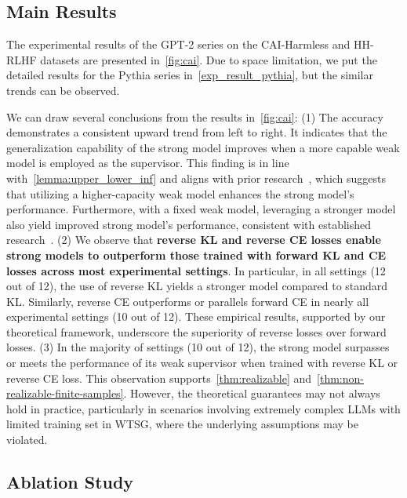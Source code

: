 \subsection{Main Results} \label{sec:main_results}

The experimental results of the GPT-2 series on the CAI-Harmless and HH-RLHF datasets are presented in~\cref{fig:cai}. 
Due to space limitation, we put the detailed results for the Pythia series in~\cref{exp_result_pythia}, but the similar trends can be observed. 

We can draw several conclusions from the results in~\cref{fig:cai}: 
(1) The accuracy demonstrates a consistent upward trend from left to right. 
It indicates that the generalization capability of the strong model improves when a more capable weak model is employed as the supervisor.
This finding is in line with~\cref{lemma:upper_lower_inf} and aligns with prior research~\citep{burns2023weak,yao2025understanding}, which suggests that utilizing a higher-capacity weak model enhances the strong model's performance.
Furthermore, with a fixed weak model, leveraging a stronger model also yield improved strong model's performance, consistent with established research~\citep{burns2023weak,yang2024super}.
(2) We observe that \textbf{reverse KL and reverse CE losses enable strong models to outperform those trained with forward KL and CE losses across most experimental settings}.
In particular, in all settings (12 out of 12), the use of reverse KL yields a stronger model compared to standard KL.
Similarly, reverse CE outperforms or parallels forward CE in nearly all experimental settings (10 out of 12). 
These empirical results, supported by our theoretical framework, underscore the superiority of reverse losses over forward losses.
(3) In the majority of settings (10 out of 12), the strong model surpasses or meets the performance of its weak supervisor when trained with reverse KL or reverse CE loss. This observation supports~\cref{thm:realizable} and~\cref{thm:non-realizable-finite-samples}. 
However, the theoretical guarantees may not always hold in practice, particularly in scenarios involving extremely complex LLMs with limited training set in WTSG, where the underlying assumptions may be violated.



\subsection{Ablation Study}

